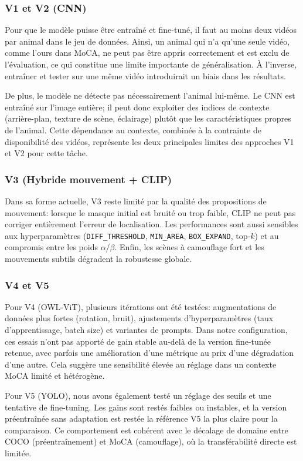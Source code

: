 \documentclass{article}
\begin{document}
\subsubsection{V1 et V2 (CNN)}

Pour que le modèle puisse être entraîné et fine-tuné, il faut au moins deux vidéos par animal dans le jeu de données. Ainsi, un animal qui n’a qu’une seule vidéo, comme l’ours dans MoCA, ne peut pas être appris correctement et est exclu de l’évaluation, ce qui constitue une limite importante de généralisation. À l’inverse, entraîner et tester sur une même vidéo introduirait un biais dans les résultats.

De plus, le modèle ne détecte pas nécessairement l’animal lui-même. Le CNN est entraîné sur l’image entière; il peut donc exploiter des indices de contexte (arrière-plan, texture de scène, éclairage) plutôt que les caractéristiques propres de l’animal. Cette dépendance au contexte, combinée à la contrainte de disponibilité des vidéos, représente les deux principales limites des approches V1 et V2 pour cette tâche.


\subsubsection{V3 (Hybride mouvement + CLIP)}
Dans sa forme actuelle, V3 reste limité par la qualité des propositions de mouvement: lorsque le masque initial est bruité ou trop faible, CLIP ne peut pas corriger entièrement l’erreur de localisation. Les performances sont aussi sensibles aux hyperparamètres (\texttt{DIFF\_THRESHOLD}, \texttt{MIN\_AREA}, \texttt{BOX\_EXPAND}, top-$k$) et au compromis entre les poids $\alpha$/$\beta$. Enfin, les scènes à camouflage fort et les mouvements subtils dégradent la robustesse globale.

\subsubsection{V4 et V5}
Pour V4 (OWL-ViT), plusieurs itérations ont été testées: augmentations de données plus fortes (rotation, bruit), ajustements d’hyperparamètres (taux d’apprentissage, batch size) et variantes de prompts. Dans notre configuration, ces essais n’ont pas apporté de gain stable au-delà de la version fine-tunée retenue, avec parfois une amélioration d’une métrique au prix d’une dégradation d’une autre. Cela suggère une sensibilité élevée au réglage dans un contexte MoCA limité et hétérogène.

Pour V5 (YOLO), nous avons également testé un réglage des seuils et une tentative de fine-tuning. Les gains sont restés faibles ou instables, et la version préentraînée sans adaptation est restée la référence V5 la plus claire pour la comparaison. Ce comportement est cohérent avec le décalage de domaine entre COCO (préentraînement) et MoCA (camouflage), où la transférabilité directe est limitée.
\end{document}
